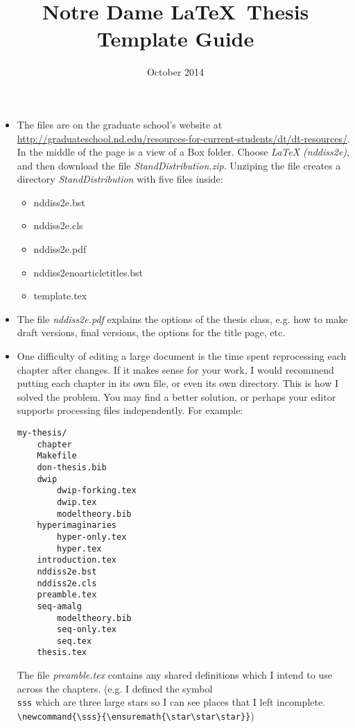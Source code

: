 \documentclass{article}
\begin{document}
\title{Notre Dame \LaTeX\ Thesis Template Guide}
\date{October 2014}
\maketitle

\begin{itemize}
\item The files are on the graduate school's website at \url{http://graduateschool.nd.edu/resources-for-current-students/dt/dt-resources/}.
In the middle of the page is a view of a Box folder. Choose \textit{LaTeX (nddiss2e)}, and then download the file \textit{StandDistribution.zip}.
Unziping the file creates a directory \textit{StandDistribution} with five files inside:

\begin{itemize}
	\item nddiss2e.bst
	\item nddiss2e.cls
	\item nddiss2e.pdf
	\item nddiss2enoarticletitles.bst
	\item template.tex
\end{itemize}

\item The file \textit{nddiss2e.pdf} explains the options of the thesis class, e.g. how to make draft versions, final versions, the options for the title page, etc.

\item One difficulty of editing a large document is the time spent reprocessing each chapter after changes.
    If it makes sense for your work, I would recommend putting each chapter in its own file, or even its own directory.
    This is how I solved the problem.
    You may find a better solution, or perhaps your editor supports processing files independently.
    For example:

\begin{verbatim}
my-thesis/
    chapter
    Makefile
    don-thesis.bib
    dwip
        dwip-forking.tex
        dwip.tex
        modeltheory.bib
    hyperimaginaries
        hyper-only.tex
        hyper.tex
    introduction.tex
    nddiss2e.bst
    nddiss2e.cls
    preamble.tex
    seq-amalg
        modeltheory.bib
        seq-only.tex
        seq.tex
    thesis.tex
\end{verbatim}

The file \textit{preamble.tex} contains any shared definitions which I intend to use across the chapters.
(e.g. I defined the symbol \texttt{\\sss} which are three large stars so I can see places that I left incomplete.
\verb=\newcommand{\sss}{\ensuremath{\star\star\star}}=)


\end{itemize}
\end{document}
